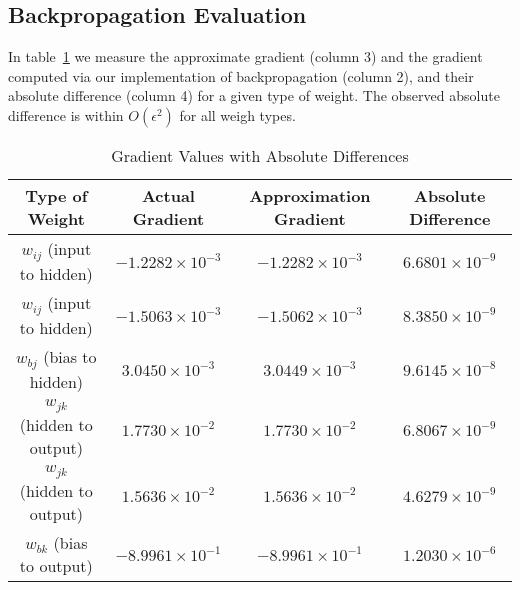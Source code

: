 \subsection{Backpropagation Evaluation}
In table~\ref{tab:gradient_table} we measure the approximate gradient (column 3)
and the gradient computed via our implementation of backpropagation (column 2),
and their absolute difference (column 4) for a given type of weight. The
observed absolute difference is within $O\left( \epsilon^2 \right)$ for all
weigh types.
\begin{table}
	\renewcommand{\arraystretch}{1.25}
	\centering
	\begin{tabular}{|c|c|c|c|}
		\hline
		Type of Weight              & Actual Gradient          & Approximation Gradient   & Absolute Difference     \\
		\hline
		$w_{ij}$ (input to hidden)  & $-1.2282 \times 10^{-3}$ & $-1.2282 \times 10^{-3}$ & $6.6801 \times 10^{-9}$ \\
		$w_{ij}$ (input to hidden)  & $-1.5063 \times 10^{-3}$ & $-1.5062 \times 10^{-3}$ & $8.3850 \times 10^{-9}$ \\
		$w_{bj}$ (bias to hidden)   & $3.0450 \times 10^{-3}$  & $3.0449 \times 10^{-3}$  & $9.6145 \times 10^{-8}$ \\
		$w_{jk}$ (hidden to output) & $1.7730 \times 10^{-2}$  & $1.7730 \times 10^{-2}$  & $6.8067 \times 10^{-9}$ \\
		$w_{jk}$ (hidden to output) & $1.5636 \times 10^{-2}$  & $1.5636 \times 10^{-2}$  & $4.6279 \times 10^{-9}$ \\
		$w_{bk}$ (bias to output)   & $-8.9961 \times 10^{-1}$ & $-8.9961 \times 10^{-1}$ & $1.2030 \times 10^{-6}$ \\
		\hline
	\end{tabular}
	\vspace{0.25cm}
	\caption{Gradient Values with Absolute Differences}
	\label{tab:gradient_table}
\end{table}

